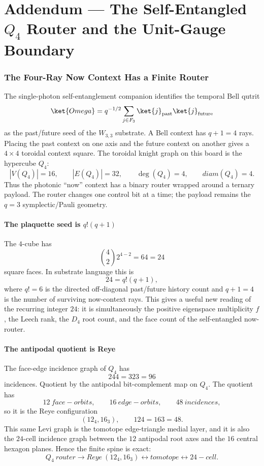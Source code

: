\documentclass[12pt,a4paper]{article}
\def\mathbb#1{#1}%
\def\mathrm#1{#1}%
\def\text#1{#1}%
\def\Omega{Omega}%
\def\cdot{ }%
\theoremstyle{definition}
\newcommand{\FF}{\mathbb{F}}
\begin{document}
\clearpage
\part*{Addendum --- The Self-Entangled $Q_4$ Router and the Unit-Gauge Boundary}

\section*{The Four-Ray Now Context Has a Finite Router}

The single-photon self-entanglement companion identifies the temporal Bell
qutrit
\[
  \ket{\Omega}=q^{-1/2}\sum_{j\in\FF_3}\ket{j}_{\rm past}\ket{j}_{\rm future}
\]
as the past/future seed of the $W_{3,3}$ substrate.  A Bell context has
$q+1=4$ rays.  Placing the past context on one axis and the future context on
another gives a $4\times4$ toroidal context square.  The toroidal knight graph
on this board is the hypercube $Q_4$:
\[
  |V(Q_4)|=16,\qquad |E(Q_4)|=32,\qquad \deg(Q_4)=4,\qquad \mathrm{diam}(Q_4)=4.
\]
Thus the photonic ``now'' context has a binary router wrapped around a ternary
payload.  The router changes one control bit at a time; the payload remains
the $q=3$ symplectic/Pauli geometry.

\subsection*{The plaquette seed is $q!(q+1)$}

The $4$-cube has
\[
  \binom{4}{2}2^{4-2}=6\cdot4=24
\]
square faces.  In substrate language this is
\[
  24=q!(q+1),
\]
where $q!=6$ is the directed off-diagonal past/future history count and
$q+1=4$ is the number of surviving now-context rays.  This gives a useful
new reading of the recurring integer $24$: it is simultaneously the positive
eigenspace multiplicity $f$, the Leech rank, the $D_4$ root count, and the
face count of the self-entangled now-router.

\subsection*{The antipodal quotient is Reye}

The face-edge incidence graph of $Q_4$ has
\[
  24\cdot4=32\cdot3=96
\]
incidences.  Quotient by the antipodal bit-complement map on $Q_4$.  The
quotient has
\[
  12\ \text{face-orbits},\qquad 16\ \text{edge-orbits},\qquad 48\ \text{incidences},
\]
so it is the Reye configuration
\[
  (12_4,16_3),\qquad 12\cdot4=16\cdot3=48.
\]
This same Levi graph is the tomotope edge-triangle medial layer, and it is
also the $24$-cell incidence graph between the $12$ antipodal root axes and
the $16$ central hexagon planes.  Hence the finite spine is exact:
\[
  Q_4\ \mathrm{router}
  \longrightarrow
  \mathrm{Reye}\ (12_4,16_3)
  \longleftrightarrow
  \mathrm{tomotope}
  \longleftrightarrow
  24\text{-cell}.
\]
\end{document}
